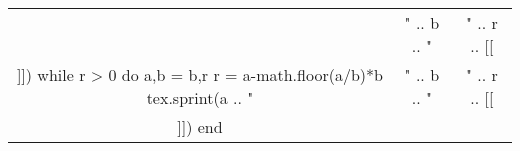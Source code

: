 \documentclass[12pt]{article}
\newcommand{\euclide}[2]{%
		\begin{center}
			\begin{tabular}{|c|c|c|}
				\hline
				\directlua{
					a,b = #1,#2
					if a < b then a,b = b,a end
					r = a-math.floor(a/b)*b

					tex.sprint(a .. "&" .. b .. "&" .. r .. [[\noexpand\\]])
					while r > 0 do
						a,b = b,r
						r = a-math.floor(a/b)*b
						tex.sprint(a .. "&" .. b .. "&" .. r .. [[\noexpand\\]])
					end
				}
				\hline
			\end{tabular}
		\end{center}
	}
\begin{document}
\euclide{587}{389}
\end{document}
